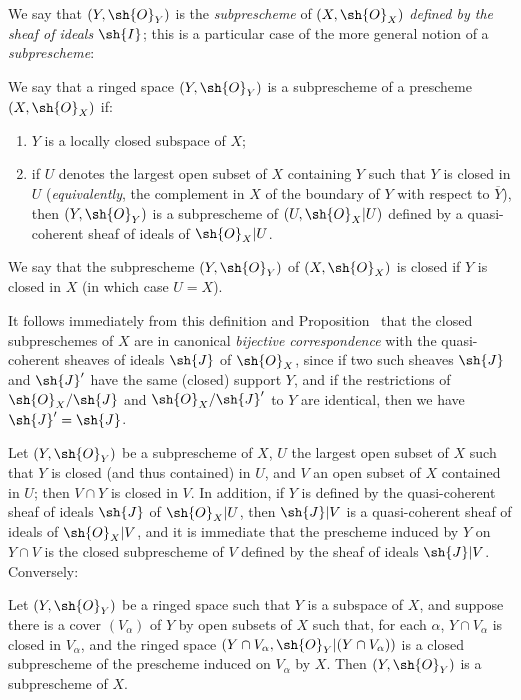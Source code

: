 We say that $(Y,\sh{O}_Y)$ is the \emph{subprescheme} of $(X,\sh{O}_X)$ \emph{defined by the sheaf of ideals $\sh{I}$};
this is a particular case of the more general notion of a \emph{subprescheme}:

\begin{definition}[4.1.3]
\label{I.4.1.3}
We say that a ringed space $(Y,\sh{O}_Y)$ is a subprescheme of a prescheme $(X,\sh{O}_X)$ if:
\begin{enumerate}
  \item[1st.] $Y$ is a locally closed subspace of $X$;
  \item[2nd.] if $U$ denotes the largest open subset of $X$ containing $Y$ such that $Y$ is closed in $U$ (\emph{equivalently}, the complement in $X$ of the boundary of $Y$ with respect to $\overline{Y}$), then $(Y,\sh{O}_Y)$ is a subprescheme of $(U,\sh{O}_X|U)$ defined by a quasi-coherent sheaf of ideals of $\sh{O}_X|U$.
\end{enumerate}
We say that the subprescheme $(Y,\sh{O}_Y)$ of $(X,\sh{O}_X)$ is closed if $Y$ is closed in $X$ (in which case $U=X$).
\end{definition}

It follows immediately from this definition and Proposition~ that the closed subpreschemes of $X$ are in canonical \emph{bijective correspondence} with the quasi-coherent sheaves of ideals $\sh{J}$ of $\sh{O}_X$, since if two such sheaves $\sh{J}$ and $\sh{J}'$ have the same (closed) support $Y$, and if the restrictions of $\sh{O}_X/\sh{J}$ and $\sh{O}_X/\sh{J}'$ to $Y$ are identical, then we have $\sh{J}'=\sh{J}$.

\begin{env}[4.1.4]
\label{I.4.1.4}
Let $(Y,\sh{O}_Y)$ be a subprescheme of $X$, $U$ the largest open subset of $X$ such that $Y$ is closed (and thus contained) in $U$, and $V$ an open subset of $X$ contained in $U$;
then $V\cap Y$ is closed in $V$.
In addition, if $Y$ is defined by the quasi-coherent sheaf of ideals $\sh{J}$ of $\sh{O}_X|U$, then $\sh{J}|V$ is a quasi-coherent sheaf of ideals of $\sh{O}_X|V$, and it is immediate that the prescheme induced by $Y$ on $Y\cap V$ is the closed subprescheme of $V$ defined by the sheaf of ideals $\sh{J}|V$.
Conversely:
\end{env}

\begin{proposition}[4.1.5]
\label{I.4.1.5}
Let $(Y,\sh{O}_Y)$ be a ringed space such that $Y$ is a subspace of $X$, and suppose there is a cover $(V_\alpha)$ of $Y$ by open subsets of $X$ such that, for each $\alpha$, $Y\cap V_\alpha$ is closed in $V_\alpha$, and the ringed space $(Y\cap V_\alpha,\sh{O}_Y|(Y\cap V_\alpha))$ is a closed subprescheme of the prescheme induced on $V_\alpha$ by $X$.
Then $(Y,\sh{O}_Y)$ is a subprescheme of $X$.
\end{proposition}

